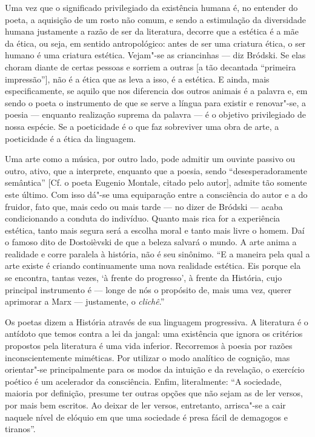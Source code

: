 Uma vez que o significado privilegiado da existência humana é, no
entender do poeta, a aquisição de um rosto não comum, e sendo a
estimulação da diversidade humana justamente a razão de ser da
literatura, decorre que a estética é a mãe da ética, ou seja, em sentido
antropológico: antes de ser uma criatura ética, o ser humano é uma
criatura estética. Vejam"-se as criancinhas --- diz Bródski. Se elas
choram diante de certas pessoas e sorriem a outras {[}a tão decantada
``primeira impressão''{]}, não é a ética que as leva a isso, é a
estética. E ainda, mais especificamente, se aquilo que nos diferencia
dos outros animais é a palavra e, em sendo o poeta o instrumento de que se
serve a língua para existir e renovar"-se, a poesia --- enquanto
realização suprema da palavra --- é o objetivo privilegiado de nossa
espécie. Se a poeticidade é o que faz sobreviver uma obra de arte, a
poeticidade é a ética da linguagem.

Uma arte como a música, por outro lado, pode admitir um ouvinte passivo
ou outro, ativo, que a interprete, enquanto que a poesia, sendo
``desesperadoramente semântica'' {[}Cf. o poeta Eugenio Montale, citado
pelo autor{]}, admite tão somente este último. Com isso dá"-se uma
equiparação entre a consciência do autor e a do fruidor, fato que, mais
cedo ou mais tarde --- no dizer de Bródski --- acaba condicionando a
conduta do indivíduo. Quanto mais rica for a experiência estética, tanto
mais segura será a escolha moral e tanto mais livre o homem. Daí o
famoso dito de Dostoièvski de que a beleza salvará o mundo. A arte anima
a realidade e corre paralela à história, não é seu sinônimo. ``E a
maneira pela qual a arte existe é criando continuamente uma nova
realidade estética. Eis porque ela se encontra, tantas vezes, `à frente
do progresso', à frente da História, cujo principal instrumento é ---
longe de nós o propósito de, mais uma vez, querer aprimorar a Marx ---
justamente, o \emph{clichê}.''

Os poetas dizem a História através de sua linguagem progressiva. A
literatura é o antídoto que temos contra a lei da jangal: uma existência
que ignora os critérios propostos pela literatura é uma vida inferior.
Recorremos à poesia por razões inconscientemente miméticas. Por utilizar
o modo analítico de cognição, mas orientar"-se principalmente para os
modos da intuição e da revelação, o exercício poético é um acelerador da
consciência. Enfim, literalmente: ``A sociedade, maioria por definição,
presume ter outras opções que não sejam as de ler versos, por mais bem
escritos. Ao deixar de ler versos, entretanto, arrisca"-se a cair naquele
nível de elóquio em que uma sociedade é presa fácil de demagogos e
tiranos''.

